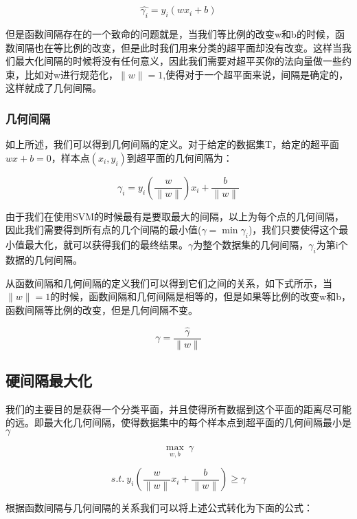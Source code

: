 		\begin{equation}
			\hat{\gamma_i} = y_i(wx_i+b)
		\end{equation}
		
		但是函数间隔存在的一个致命的问题就是，当我们等比例的改变w和b的时候，函数间隔也在等比例的改变，但是此时我们用来分类的超平面却没有改变。这样当我们最大化间隔的时候将没有任何意义，因此我们需要对超平买你的法向量做一些约束，比如对w进行规范化，$\|w\|=1$,使得对于一个超平面来说，间隔是确定的，这样就成了几何间隔。
		
		\subsubsection{几何间隔}
		如上所述，我们可以得到几何间隔的定义。对于给定的数据集T，给定的超平面$wx+b=0$，样本点$(x_i,y_i)$到超平面的几何间隔为：
		
		\begin{equation}
			\gamma_i = y_i(\frac{w}{\|w\|})x_i + \frac{b}{\|w\|}
		\end{equation}
		
		由于我们在使用SVM的时候最有是要取最大的间隔，以上为每个点的几何间隔，因此我们需要得到所有点的几个间隔的最小值($\gamma = \min \gamma_i $)，我们只要使得这个最小值最大化，就可以获得我们的最终结果。$\gamma$为整个数据集的几何间隔，$\gamma_i$为第i个数据的几何间隔。
		
		从函数间隔和几何间隔的定义我们可以得到它们之间的关系，如下式所示，当$\|w\|=1$的时候，函数间隔和几何间隔是相等的，但是如果等比例的改变w和b，函数间隔等比例的改变，但是几何间隔不变。
		
		\begin{equation}
		\gamma = \frac{\hat{\gamma}}{\|w\|}
		\end{equation}
	\subsection{硬间隔最大化}
	我们的主要目的是获得一个分类平面，并且使得所有数据到这个平面的距离尽可能的远。即最大化几何间隔，使得数据集中的每个样本点到超平面的几何间隔最小是$\gamma$
	
	\begin{equation}
		\max_{w,b}\ \gamma
	\end{equation}
	
	\begin{equation}
		s.t.\ y_i(\frac{w}{\|w\|}x_i + \frac{b}{\|w\|}) \geq \gamma
	\end{equation}
	
	根据函数间隔与几何间隔的关系我们可以将上述公式转化为下面的公式：
	
